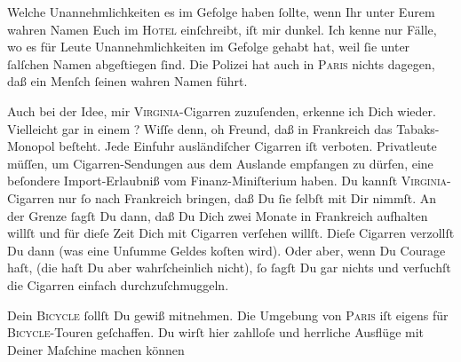 \pstart
           Welche Unannehmlichkeiten es im Gefolge haben ſollte, wenn Ihr unter Eurem wahren
               Namen Euch im \textsc{Hotel} einſchreibt, iſt mir dunkel. Ich kenne
               nur Fälle, wo es für Leute {\pb} Unannehmlichkeiten im Gefolge gehabt hat, weil ſie unter ſalſchen Namen
               abgeſtiegen ſind. Die Polizei hat auch in \textsc{Paris} nichts dagegen, daß ein Menſch ſeinen wahren Namen führt.\pend
           
\pstart
           Auch bei der Idee, mir \textsc{Virginia}-Cigarren zuzuſenden,
               erkenne ich Dich wieder. Vielleicht gar in einem \label{K_L02806-2v}\label{K_L02806-2}? Wiſſe denn, oh Freund, daß in Frankreich
               das Tabaks-Monopol beſteht. Jede Einfuhr 
               ausländiſcher Cigarren iſt verboten. Privatleute müſſen, um Cigarren-Sendungen  aus dem {\pb}Auslande
               empfangen zu dürfen, eine beſondere Import-Erlaubniß vom Finanz-Miniſterium haben. Du kannſt \textsc{Virginia}-Cigarren nur ſo nach Frankreich
               bringen, daß Du ſie ſelbſt mit Dir nimmſt. An der Grenze ſagſt Du dann, daß Du Dich
               zwei Monate in Frankreich aufhalten willſt und
               für dieſe Zeit Dich mit Cigarren verſehen willſt. Dieſe Cigarren verzollſt Du dann
               (was eine Unſumme  Geldes koſten wird). Oder aber,
               wenn Du Courage haſt, (die haſt Du aber wahrſcheinlich nicht), {\pb}ſo ſagſt Du gar nichts und verſuchſt die Cigarren
               einfach durchzuſchmuggeln.\pend
           
\pstart
           Dein \textsc{Bicycle} ſollſt Du gewiß mitnehmen. Die Umgebung von
                  \textsc{Paris} iſt eigens für \textsc{Bicycle}-Touren geſchaffen. Du wirſt
               hier zahlloſe und herrliche Ausflüge mit Deiner Maſchine machen können{\dotsfive}\pend
           
